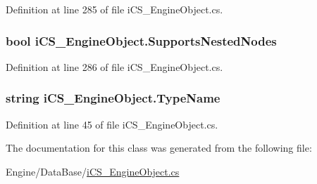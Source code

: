 Definition at line 285 of file i\+C\+S\+\_\+\+Engine\+Object.\+cs.

\hypertarget{classi_c_s___engine_object_ae5b6d83d159474f4e829cf4210c575c6}{
\subsubsection[{Supports\+Nested\+Nodes}]{\setlength{\rightskip}{0pt plus 5cm}bool i\+C\+S\+\_\+\+Engine\+Object.\+Supports\+Nested\+Nodes\hspace{0.3cm}{\ttfamily [get]}}}\label{classi_c_s___engine_object_ae5b6d83d159474f4e829cf4210c575c6}


Definition at line 286 of file i\+C\+S\+\_\+\+Engine\+Object.\+cs.

\hypertarget{classi_c_s___engine_object_aba60f65a6177e5e1633e174faf281018}{
\subsubsection[{Type\+Name}]{\setlength{\rightskip}{0pt plus 5cm}string i\+C\+S\+\_\+\+Engine\+Object.\+Type\+Name\hspace{0.3cm}{\ttfamily [get]}}}\label{classi_c_s___engine_object_aba60f65a6177e5e1633e174faf281018}


Definition at line 45 of file i\+C\+S\+\_\+\+Engine\+Object.\+cs.



The documentation for this class was generated from the following file\+:\begin{DoxyCompactItemize}
\item 
Engine/\+Data\+Base/\hyperlink{i_c_s___engine_object_8cs}{i\+C\+S\+\_\+\+Engine\+Object.\+cs}\end{DoxyCompactItemize}
